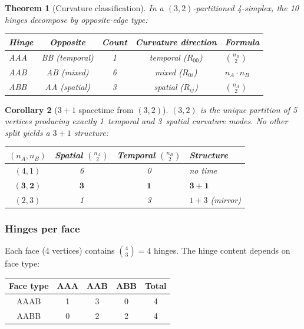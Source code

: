 \documentclass[12pt]{article}
\newtheorem{theorem}{Theorem}[section]
\newtheorem{corollary}[theorem]{Corollary}
\theoremstyle{remark}
\theoremstyle{definition}
\begin{document}
\begin{theorem}[Curvature classification]
\label{thm:opposite}
In a $(3,2)$-partitioned 4-simplex, the 10 hinges decompose by opposite-edge type:
\begin{center}
\begin{tabular}{lcccl}
\toprule
Hinge & Opposite & Count & Curvature direction & Formula \\
\midrule
AAA & BB (temporal) & 1 & temporal ($R_{00}$) & $\binom{n_B}{2}$ \\
AAB & AB (mixed)    & 6 & mixed ($R_{0i}$)    & $n_A \cdot n_B$ \\
ABB & AA (spatial)  & 3 & spatial ($R_{ij}$)   & $\binom{n_A}{2}$ \\
\bottomrule
\end{tabular}
\end{center}
\end{theorem}

\begin{corollary}[$3+1$ spacetime from $(3,2)$]
\label{cor:31_spacetime}
$(3,2)$ is the \emph{unique} partition of 5 vertices producing exactly 1~temporal and 3~spatial curvature modes.  No other split yields a $3+1$ structure:

\begin{center}
\begin{tabular}{cccl}
\toprule
$(n_A,n_B)$ & Spatial $\binom{n_A}{2}$ & Temporal $\binom{n_B}{2}$ & Structure \\
\midrule
$(4,1)$ & 6 & 0 & no time \\
$\mathbf{(3,2)}$ & $\mathbf{3}$ & $\mathbf{1}$ & $\boldsymbol{3+1}$ \\
$(2,3)$ & 1 & 3 & $1+3$ (mirror) \\
\bottomrule
\end{tabular}
\end{center}
\end{corollary}

\subsubsection{Hinges per face}

Each face (4 vertices) contains $\binom{4}{3} = 4$ hinges. The hinge content depends on face type:

\begin{center}
\begin{tabular}{ccccc}
\hline
Face type & AAA & AAB & ABB & Total \\
\hline
AAAB & 1 & 3 & 0 & 4 \\
AABB & 0 & 2 & 2 & 4 \\
\hline
\end{tabular}
\end{center}
\end{document}
